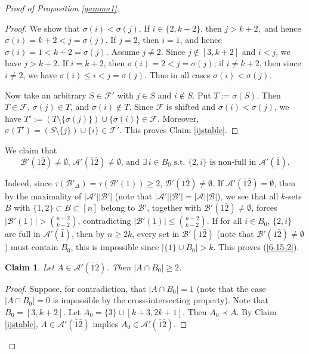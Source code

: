 \documentclass[a4paper,11pt]{article}
\newtheorem{claim}[theorem]{Claim}
\newcommand{\m}{\mathcal}
\begin{document}
\begin{proof}[Proof of Proposition \ref{gamma1}]
\begin{proof}
We show that
$\sigma(i)<\sigma(j).$
If $i\in \{2,k+2\}$, then $j>k+2,$ and hence $\sigma(i)=k+2<j=\sigma(j)$. 
If $j=2$, then $i=1$, and hence
$\sigma(i)=1<k+2=\sigma(j).$ Assume $j\ne 2$.
Since $j\notin[3,k+2]$ and $i<j$, we have $j>k+2$. If
$i=k+2$, then $\sigma(i)=2<j=\sigma(j)$; 
if $i\ne k+2$, then since $i\ne 2$, we have $\sigma(i)\le i<j=\sigma(j)$. Thus in all cases $\sigma(i)<\sigma(j)$.

Now take an arbitrary $S\in\m F'$ with $j\in S$ and $i\notin S$. Put
$T:=\sigma(S).$
Then $T\in\m F$, $\sigma(j)\in T$, and $\sigma(i)\notin T$. Since
$\m F$ is shifted and $\sigma(i)<\sigma(j)$, we have
$T':=(T\setminus\{\sigma(j)\})\cup\{\sigma(i)\}\in \m F.$ 
Moreover, $\sigma(T')=(S\setminus\{j\})\cup\{i\}\in \m F'.$
This proves Claim \ref{ijstable}.
\end{proof}
 
We claim that
\begin{equation}\label{6-15-2}
\text{$\m B'(1\bar2)\ne \emptyset$, $\mathcal A'(\bar1 \bar 2)\ne \emptyset$, and $\exists\, i\in B_0$ s.t. $\{2,i\}$ is non-full in $\m A'(\bar1)$.}    
\end{equation}

Indeed, 
since $\tau(\m B'_{\Delta})=\tau(\m B'(1))\ge 2$, $\m B'(1\bar2)\ne \emptyset$. 
If $\mathcal A'(\bar1 \bar 2)= \emptyset$, then by the maximality of $|\m A'||\m B'|$ (note that $|\m A'||\m B'|=|\m A||\m B|$), we see that all $k$-sets $B$ with $\{1,2\}\subset B\subset [n]$ belong to $\m B'$, together with $\m B'(1\bar2)\ne \emptyset$, forces $|\m B'(1)|>{n-2\choose k-2}$, contradicting $|\m B'(1)|\le{n-2\choose k-2}$. If for all $i\in B_0$, $\{2,i\}$ are full in $\m A'(\bar1)$, then by $n\ge 2k$, every set in $\m B'(1\bar2)$ (note that $\m B'(1\bar2)\ne \emptyset$) must contain $B_0$, this is impossible since $|\{1\}\cup B_0|>k$. This proves (\ref{6-15-2}).


\begin{claim}\label{6-17-4}
Let $A\in \m A'(\bar1\bar2)$. Then $|A\cap B_0|\ge 2$.
\end{claim}

\begin{proof}
\iffalse
Suppose, for contradiction, that $|A\cap B_0|=1$ (note that the case $|A\cap B_0|=0$ is impossible by the cross-intersecting property). 
Note that $B_0=[3,k+2]$. 
Let $A_0=\{3\}\cup [k+3,2k+1]$. 
Then $A_0\prec A$. 
By Claim \ref{ijstable}, $A\in \m A'(\bar1\bar2)$ implies $A_0\in \m A'(\bar1\bar2)$. 


\end{proof}
\end{proof}
\end{document}
